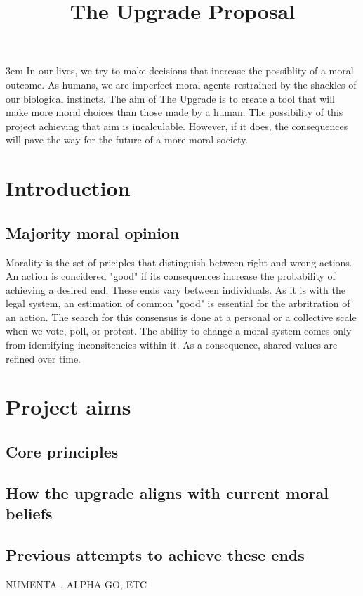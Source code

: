 \documentclass[12pt]{article}
\title{The Upgrade Proposal}
\date{\vspace{-5ex}}
\author{\vspace{-5ex}}
\begin{document}
\maketitle
\par
\begingroup
\leftskip3em
\rightskip\leftskip
In our lives, we try to make decisions that increase the possiblity of a moral outcome. As humans, we are imperfect moral agents restrained by the shackles of our biological instincts. The aim of The Upgrade is to create a tool that will make more moral choices than those made by a human. The possibility of this project achieving that aim is incalculable. However, if it does, the consequences will pave the way for the future of a more moral society.
\par
\endgroup
\newpage

\section*{Introduction}
\subsection*{Majority moral opinion}
Morality is the set of priciples that distinguish between right and wrong actions. An action is concidered "good" if its consequences increase the probability of achieving a desired end. These ends vary between individuals. As it is with the legal system, an estimation of common "good" is essential for the arbritration of an action. The search for this consensus is done at a personal or a collective scale when we vote, poll, or protest. The ability to change a moral system comes only from identifying inconsitencies within it. As a consequence, shared values are refined over time. 

\section*{Project aims}
\subsection*{Core principles}
\subsection*{How the upgrade aligns with current moral beliefs}
\subsection*{Previous attempts to achieve these ends}
NUMENTA \cite{numentahome}, ALPHA GO, ETC
\end{document}
